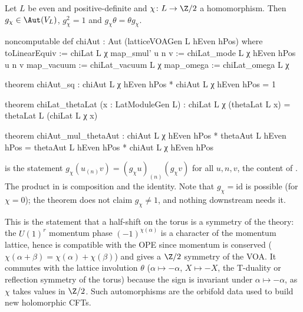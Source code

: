\begin{theorem}\label{ch03:thm:chiAut}
Let $L$ be even and positive-definite and $\chi\colon L\to\Z/2$ a homomorphism. Then $g_\chi\in
\Aut(V_L)$, $g_\chi^2=1$ and $g_\chi\theta=\theta g_\chi$.
\end{theorem}
\begin{leancode}
noncomputable def chiAut : Aut (latticeVOAGen L hEven hPos) where
  toLinearEquiv := chiLat L χ
  map_smul' u n v := chiLat_mode L χ hEven hPos u n v
  map_vacuum := chiLat_vacuum L χ
  map_omega := chiLat_omega L χ

theorem chiAut_sq : chiAut L χ hEven hPos * chiAut L χ hEven hPos = 1

theorem chiLat_thetaLat (x : LatModuleGen L) :
    chiLat L χ (thetaLat L x) = thetaLat L (chiLat L χ x)

theorem chiAut_mul_thetaAut :
    chiAut L χ hEven hPos * thetaAut L hEven hPos = thetaAut L hEven hPos * chiAut L χ hEven hPos
\end{leancode}

\begin{dictionary}
 is the statement $g_\chi(u_{(n)}v)=(g_\chi u)_{(n)}(g_\chi v)$ for all
$u,n,v$, the content of . The product \lean{*} in  is composition and
 the identity. Note that $g_\chi=\mathrm{id}$ is possible (for $\chi=0$); the theorem does
not claim $g_\chi\ne1$, and nothing downstream needs it.
\end{dictionary}

\begin{physics}
This is the statement that a half-shift on the torus is a symmetry of the theory: the $U(1)^r$ momentum phase $(-1)^{\chi(\alpha)}$ is a character of the momentum lattice, hence is compatible with the OPE since momentum is conserved ($\chi(\alpha+\beta)=\chi(\alpha)+\chi(\beta)$) and gives a $\Z/2$ symmetry of the VOA. It commutes with the lattice involution $\theta$ ($\alpha\mapsto-\alpha$, $X\mapsto-X$, the T-duality or reflection symmetry of the torus) because the sign is invariant under $\alpha\mapsto-\alpha$, as $\chi$ takes values in $\Z/2$. Such automorphisms are the orbifold data used to build new holomorphic CFTs.
\end{physics}

